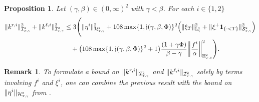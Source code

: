 \documentclass[10pt]{article} %
\newtheorem{proposition}[theorem]{Proposition}
\newtheorem{remark}[theorem]{Remark}
\newcommand\cH{\mathcal H}
\newcommand\cI{\mathcal I}
\newcommand\cS{\mathcal S}
\newcommand{\smalltext}[1]{\text{\fontsize{4}{4}\selectfont$#1$}}
\def \H{\mathbb{H}}
\def \L{\mathbb{L}}
\newcommand{\1}{\mathbf{1}}
\begin{document}
\begin{proposition}\label{prop::weighted_k_estimate}
	Let $(\gamma,\beta) \in (0,\infty)^2$ with $\gamma < \beta$. For each $i \in \{1,2\}$
	\begin{align}\label{eq::weighted_k_inequality}
		\|k^{r,i}\|^2_{\cI^\smalltext{2}_{\smalltext{T}\smalltext{,}\smalltext{\gamma}}} + \|k^{\ell,i}\|^2_{\cI^\smalltext{2}_{\smalltext{T}\smalltext{,}\smalltext{\gamma}}} 
		&\leq 3 \Bigg( \|\eta^i\|^2_{\cH^\smalltext{2}_{\smalltext{T}\smalltext{,}\smalltext{\gamma}}} + 108 \max\{1, \mathfrak{j}(\gamma,\beta,\Phi)\}^2\Big(\|\xi_T\|^2_{\L^\smalltext{2}_\smalltext{\gamma}} + \|\xi^+_\cdot\mathbf{1}_{\{\cdot < T\}}\|^2_{\cS^\smalltext{2}_{\smalltext{T}\smalltext{,}\smalltext{\gamma}}} \Big) \nonumber\\
		&\quad + \big(108 \max\{1, \mathfrak{j}(\gamma,\beta,\Phi)\}^2 + 1\big)\frac{(1+\gamma\Phi)}{\beta-\gamma}\bigg\|\frac{f^i}{\alpha}\bigg\|^2_{\H^\smalltext{2}_{\smalltext{T}\smalltext{,}\smalltext{\beta}}} \Bigg).
	\end{align}
\end{proposition}

\begin{remark}
	To formulate a bound on $\|k^{r,i}\|_{\cI^\smalltext{2}_{\smalltext{T}\smalltext{,}\smalltext{\gamma}}}$ and $\|k^{\ell,i}\|_{\cI^\smalltext{2}_{\smalltext{T}\smalltext{,}\smalltext{\gamma}}}$ solely by terms involving $f^i$ and $\xi^i$, one can combine the previous result with the bound on $\|\eta^i\|_{\cH^\smalltext{2}_{\smalltext{T}\smalltext{,}\smalltext{\gamma}}}$ from {\rm{}}.
\end{remark}
\end{document}
